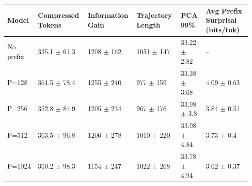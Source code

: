 \begin{tabular}{llllll}
\toprule
 Model           & Compressed Tokens         & Information Gain        & Trajectory Length       & PCA 99\%                   & Avg Prefix Surprisal (bits/tok)   \\
\midrule
 No prefix       & 335.1 {\small $\pm$ 61.3} & 1208 {\small $\pm$ 162} & 1051 {\small $\pm$ 147} & 33.22 {\small $\pm$ 2.82} & --                                \\
 \midrule
 P=128           & 361.5 {\small $\pm$ 78.4} & 1255 {\small $\pm$ 240} & 977 {\small $\pm$ 159}  & 33.38 {\small $\pm$ 3.68} & 4.09 {\small $\pm$ 0.63}          \\
 P=256           & 352.8 {\small $\pm$ 87.9} & 1205 {\small $\pm$ 234} & 967 {\small $\pm$ 176}  & 33.98 {\small $\pm$ 3.8}  & 3.84 {\small $\pm$ 0.51}          \\
 P=512           & 363.5 {\small $\pm$ 96.8} & 1206 {\small $\pm$ 278} & 1010 {\small $\pm$ 220} & 33.08 {\small $\pm$ 4.84} & 3.73 {\small $\pm$ 0.4}           \\
 P=1024          & 360.2 {\small $\pm$ 98.3} & 1154 {\small $\pm$ 247} & 1022 {\small $\pm$ 268} & 33.78 {\small $\pm$ 4.94} & 3.62 {\small $\pm$ 0.37}          \\
\bottomrule
\end{tabular}
